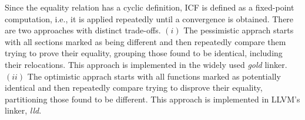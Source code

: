 
Since the equality relation has a cyclic definition, ICF is defined as a fixed-point computation, i.e., it is applied repeatedly until a convergence is obtained.
There are two approaches with distinct trade-offs.
$(i)$ The pessimistic apprach starts with all sections marked as being different and then repeatedly compare them trying to prove their equality, grouping those found to be identical, including their relocations.
This approach is implemented in the widely used \textit{gold} linker.
$(ii)$ The optimistic apprach starts with all functions marked as potentially identical and then repeatedly compare trying to disprove their equality, partitioning those found to be different.
This approach is implemented in LLVM's linker, \textit{lld}.







